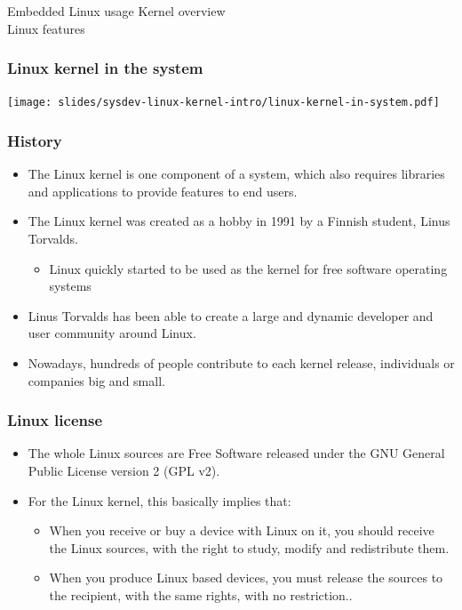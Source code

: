 
\subchapterframe
{Embedded Linux usage}
{Kernel overview\\
\normalsize Linux features}

\begin{frame}
  \frametitle{Linux kernel in the system}
  \begin{center}
    \texttt{[image: slides/sysdev-linux-kernel-intro/linux-kernel-in-system.pdf]}
  \end{center}
\end{frame}

\begin{frame}
  \frametitle{History}
  \begin{itemize}
  \item The Linux kernel is one component of a system, which also
    requires libraries and applications to provide features to end
    users.
  \item The Linux kernel was created as a hobby in 1991 by a Finnish
    student, Linus Torvalds.
    \begin{itemize}
    \item Linux quickly started to be used as the kernel for free
      software operating systems
    \end{itemize}
  \item Linus Torvalds has been able to create a large and dynamic
    developer and user community around Linux.
  \item Nowadays, hundreds of people contribute to each kernel
    release, individuals or companies big and small.
  \end{itemize}
\end{frame}

\begin{frame}
  \frametitle{Linux license}
  \begin{itemize}
  \item The whole Linux sources are Free Software released under the
    GNU General Public License version 2 (GPL v2).
  \item For the Linux kernel, this basically implies that:
    \begin{itemize}
    \item When you receive or buy a device with Linux on it, you
      should receive the Linux sources, with the right to study,
      modify and redistribute them.
    \item When you produce Linux based devices, you must release the
      sources to the recipient, with the same rights, with no
      restriction..
    \end{itemize}
  \end{itemize}
\end{frame}

